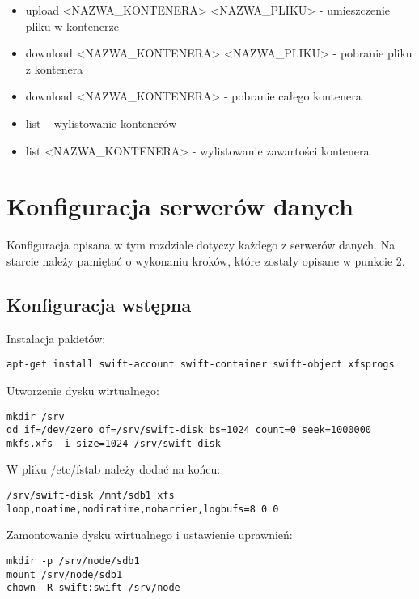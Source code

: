 \documentclass[12pt]{article}
\begin{document}
\begin{itemize}
\item upload <NAZWA\_KONTENERA> <NAZWA\_PLIKU> - umieszczenie pliku w kontenerze
\item download <NAZWA\_KONTENERA> <NAZWA\_PLIKU> - pobranie pliku z kontenera
\item download <NAZWA\_KONTENERA> - pobranie całego kontenera
\item list – wylistowanie kontenerów
\item list <NAZWA\_KONTENERA> - wylistowanie zawartości kontenera
\end{itemize}
	
\section{Konfiguracja serwerów danych}

Konfiguracja opisana w tym rozdziale dotyczy każdego z serwerów danych. Na starcie należy pamiętać o wykonaniu kroków, które zostały opisane w punkcie 2.

\subsection{Konfiguracja wstępna}

Instalacja pakietów: 

\begin{verbatim}
apt-get install swift-account swift-container swift-object xfsprogs
\end{verbatim}

Utworzenie dysku wirtualnego: 

\begin{verbatim}
mkdir /srv
dd if=/dev/zero of=/srv/swift-disk bs=1024 count=0 seek=1000000
mkfs.xfs -i size=1024 /srv/swift-disk
\end{verbatim}

W pliku /etc/fstab należy dodać na końcu:

\begin{verbatim}
/srv/swift-disk /mnt/sdb1 xfs loop,noatime,nodiratime,nobarrier,logbufs=8 0 0
\end{verbatim}

Zamontowanie dysku wirtualnego i ustawienie uprawnień: 

\begin{verbatim}
mkdir -p /srv/node/sdb1
mount /srv/node/sdb1
chown -R swift:swift /srv/node
\end{verbatim}
\end{document}
